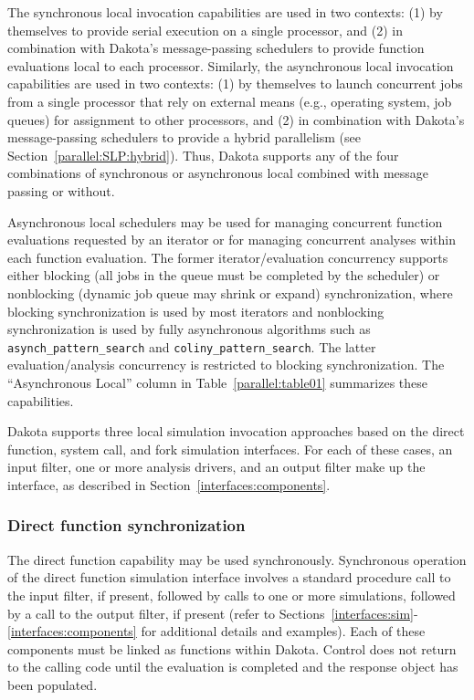 The synchronous local invocation capabilities are used in two
contexts: (1) by themselves to provide serial execution on a single
processor, and (2) in combination with Dakota's message-passing
schedulers to provide function evaluations local to each
processor. Similarly, the asynchronous local invocation capabilities
are used in two contexts: (1) by themselves to launch concurrent jobs
from a single processor that rely on external means (e.g., operating
system, job queues) for assignment to other processors, and (2) in
combination with Dakota's message-passing schedulers to provide a
hybrid parallelism (see Section~\ref{parallel:SLP:hybrid}).  Thus,
Dakota supports any of the four combinations of synchronous or
asynchronous local combined with message passing or without.

Asynchronous local schedulers may be used for managing concurrent
function evaluations requested by an iterator or for managing
concurrent analyses within each function evaluation.  The former
iterator/evaluation concurrency supports either blocking (all jobs in
the queue must be completed by the scheduler) or nonblocking (dynamic
job queue may shrink or expand) synchronization, where blocking
synchronization is used by most iterators and nonblocking
synchronization is used by fully asynchronous algorithms such as
\texttt{asynch\_pattern\_search} and \texttt{coliny\_pattern\_search}.  The
latter evaluation/analysis concurrency is restricted to blocking
synchronization.  The ``Asynchronous Local'' column in
Table~\ref{parallel:table01} summarizes these capabilities.

Dakota supports three local simulation invocation approaches based on
the direct function, system call, and fork simulation interfaces.  For
each of these cases, an input filter, one or more analysis drivers,
and an output filter make up the interface, as described in
Section~\ref{interfaces:components}.

\subsubsection{Direct function synchronization}\label{parallel:SLP:local:direct}

The direct function capability may be used synchronously. Synchronous
operation of the direct function simulation interface involves a
standard procedure call to the input filter, if present, followed by
calls to one or more simulations, followed by a call to the output
filter, if present (refer to
Sections~\ref{interfaces:sim}-\ref{interfaces:components} for
additional details and examples). Each of these components must be
linked as functions within Dakota. Control does not return to the
calling code until the evaluation is completed and the response object
has been populated.

